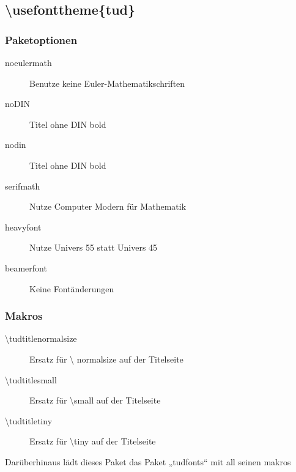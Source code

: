 \documentclass[presentation,t]{beamer}
\begin{document}
\subsection{\textbackslash usefonttheme\{tud\}}
\label{sec-2-3}
\begin{frame}
\frametitle{Paketoptionen}
\label{sec-2-3-1}

\begin{description}
\item[noeulermath] Benutze keine Euler-Mathematikschriften
\item[noDIN] Titel ohne DIN bold
\item[nodin] Titel ohne DIN bold
\item[serifmath] Nutze Computer Modern für Mathematik
\item[heavyfont] Nutze Univers 55 statt Univers 45
\item[beamerfont] Keine Fontänderungen
\end{description}
\end{frame}
\begin{frame}
\frametitle{Makros}
\label{sec-2-3-2}

\begin{description}
\item[\textbackslash tudtitlenormalsize] Ersatz für \textbackslash
  normalsize auf der Titelseite
\item[\textbackslash tudtitlesmall] Ersatz für \textbackslash small auf der Titelseite
\item[\textbackslash tudtitletiny] Ersatz für \textbackslash tiny auf der Titelseite
\end{description}

Darüberhinaus lädt dieses Paket das Paket „tudfonts“ mit all seinen makros
\end{frame}
\end{document}
